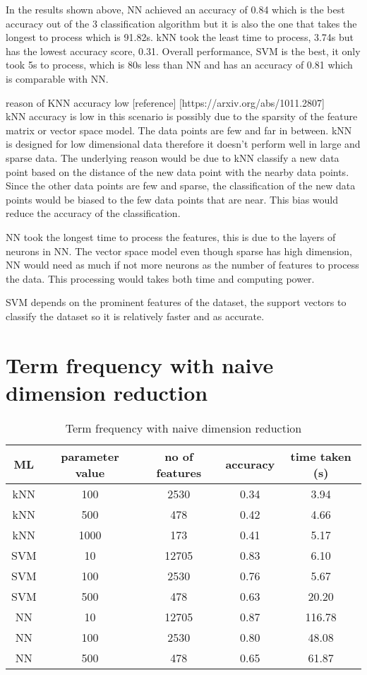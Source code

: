 In the results shown above, NN achieved an accuracy of 0.84 which is the best accuracy out of the 3 classification algorithm but it is also the one that takes the longest to process which is 91.82s. kNN took the least time to process, 3.74s but has the lowest accuracy score, 0.31. Overall performance, SVM is the best, it only took 5s to process, which is 80s less than NN and has an accuracy of 0.81 which is comparable with NN. 

reason of KNN accuracy low [reference] [https://arxiv.org/abs/1011.2807]\\
kNN accuracy is low in this scenario is possibly due to the sparsity of the feature matrix or vector space model. The data points are few and far in between. kNN is designed for low dimensional data therefore it doesn't perform well in large and sparse data. The underlying reason would be due to kNN classify a new data point based on the distance of the new data point with the nearby data points. Since the other data points are few and sparse, the classification of the new data points would be biased to the few data points that are near. This bias would reduce the accuracy of the classification.

NN took the longest time to process the features, this is due to the layers of neurons in NN. The vector space model even though sparse has high dimension, NN would need as much if not more neurons as the number of features to process the data. This processing would takes both time and computing power.

SVM depends on the prominent features of the dataset, the support vectors to classify the dataset so it is relatively faster and as accurate.

\clearpage
\section{Term frequency with naive dimension reduction}

\begin{table} [ht]
	\centering
	\begin{tabular}{|| c | c | c | c | c||}
		\hline
		ML & parameter value & no of features & accuracy & time taken (s) \\ [0.5ex]
		\hline\hline
		kNN & 100 & 2530 & 0.34 & 3.94 \\ 
		\hline
		kNN & 500 & 478 & 0.42 & 4.66 \\ 
		\hline
		kNN & 1000 & 173 & 0.41 & 5.17 \\ 
		\hline\hline
		SVM & 10 & 12705 & 0.83 & 6.10 \\
		\hline
		SVM & 100 & 2530 & 0.76 & 5.67 \\
		\hline
		SVM & 500 & 478 & 0.63 & 20.20 \\
		\hline\hline
		NN & 10 & 12705 & 0.87 & 116.78 \\
		\hline
		NN & 100 & 2530 & 0.80 & 48.08 \\
		\hline
		NN & 500 & 478 & 0.65 & 61.87 \\
		\hline
	\end{tabular}
\caption{Term frequency with naive dimension reduction}
\label{tbl:termFrequencyNaive}
\end{table}

